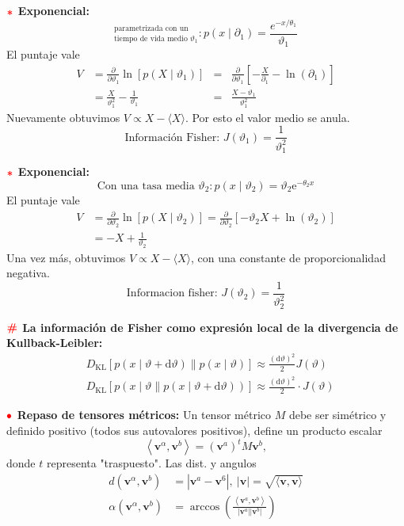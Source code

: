 \documentclass[%
 reprint,
 amsmath,amssymb,
 aps,
]{revtex4-1}
\begin{document}
\textbf{$\textcolor{red}{\color{red}{\boldsymbol{*}}}$ Exponencial:} 
$$
^\text{parametrizada con un} 
_{\text{tiempo de vida medio }\vartheta_{1}} : 
p\left(x \mid \partial_{1}\right)=\frac{e^{-x / \theta_{1}}}{\vartheta_{1}}
$$
El puntaje vale
$$
\begin{aligned}
V &=\frac{\partial}{\partial \vartheta_{1}} \ln \left[p\left(X \mid \vartheta_{1}\right)\right] &= &\frac{\partial}{\partial \vartheta_{1}}\left[-\frac{X}{\partial_{1}}-\ln \left(\partial_{1}\right)\right] \\
&=\frac{X}{\vartheta_{1}^{2}}-\frac{1}{\vartheta_{1}} &= &\frac{X-\vartheta_{1}}{\vartheta_{1}^{2}}
\end{aligned}
$$
Nuevamente obtuvimos $V \propto X-\langle X\rangle$. Por esto el valor medio se anula.
$$\text{Información Fisher: }J\left(\vartheta_{1}\right)=\frac{1}{\vartheta_{1}^{2}}$$

\textbf{$\textcolor{red}{\color{red}{\boldsymbol{*}}}$ Exponencial:} 
$$
\text{Con una tasa media } \vartheta_{2} :
p\left(x \mid \vartheta_{2}\right)=\vartheta_{2} \mathrm{e}^{-\theta_{2} x}
$$
El puntaje vale
$$
\begin{aligned}
V &=\frac{\partial}{\partial \vartheta_{2}} \ln \left[p\left(X \mid \vartheta_{2}\right)\right] =\frac{\partial}{\partial \vartheta_{2}}\left[-\vartheta_{2} X+\ln \left(\vartheta_{2}\right)\right] \\
&=-X+\frac{1}{\vartheta_{2}}
\end{aligned}
$$
Una vez más, obtuvimos $V \propto X-\langle X\rangle$, con una constante de proporcionalidad negativa.
$$\text{Informacion fisher: }J\left(\vartheta_{2}\right)=\frac{1}{\vartheta_{2}^{2}}$$

\textbf{$\color{red}{\textbf{\#}}$ La información de Fisher como expresión local de la divergencia de Kullback-Leibler:}
$$
\begin{aligned}
  &D_{\mathrm{KL}}[p(x \mid \vartheta+\mathrm{d} \vartheta) \| p(x \mid \vartheta)] \approx  \frac{(\mathrm{d} \vartheta)^{2}}{2} J(\vartheta)\\
  &D_{\mathrm{KL}}[p(x \mid \vartheta \| p(x \mid \vartheta+\mathrm{d} \vartheta))] \approx \frac{(\mathrm{d} \vartheta)^{2}}{2} \cdot J(\vartheta)
\end{aligned}
$$

\textbf{$\color{red}{\bullet}$ Repaso de tensores métricos:} 
Un tensor métrico $M$ debe ser simétrico y definido positivo
(todos sus autovalores positivos), define un producto escalar
$$
\left\langle\boldsymbol{v}^{\alpha}, \boldsymbol{v}^{b}\right\rangle=\left(\boldsymbol{v}^{a}\right)^{t} M \boldsymbol{v}^{b},
$$
donde $t$ representa "traspuesto". Las dist. y angulos
$$
\begin{aligned}
d\left(\boldsymbol{v}^{\alpha}, \boldsymbol{v}^{b}\right) &=\left|\boldsymbol{v}^{a}-\boldsymbol{v}^{6}\right|, \ |\boldsymbol{v}| =\sqrt{\langle\boldsymbol{v}, \boldsymbol{v}\rangle} \\
\alpha\left(\boldsymbol{v}^{\alpha}, \boldsymbol{v}^{b}\right) &=\operatorname{arccos}\left(
  \frac{
    \left\langle
    \boldsymbol{v}^{a}, \boldsymbol{v}^{b}
    \right\rangle
    }{\left|\boldsymbol{v}^{a}\right|\left|\mathbf{v}^{b}\right|}
  \right)
\end{aligned}
$$
\end{document}
